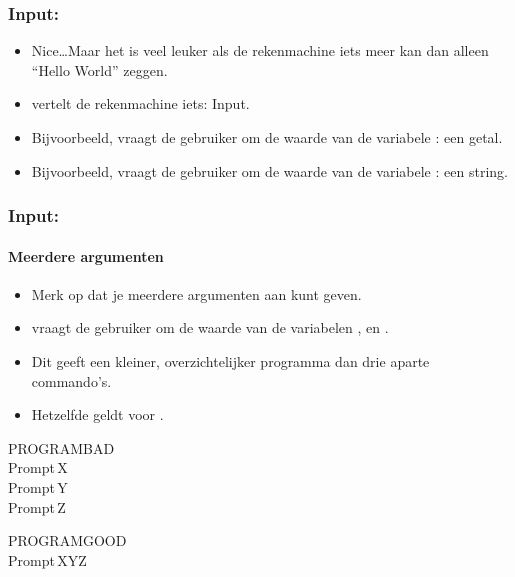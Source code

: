 \begin{frame}
\frametitle{Input: }

\begin{itemize}
  \item<1-> Nice\ldots Maar het is veel leuker als de rekenmachine iets meer kan dan alleen ``Hello World'' zeggen.
  \item<2->  vertelt de rekenmachine iets: Input.
  \item<3-> Bijvoorbeeld,  vraagt de gebruiker om de waarde van de variabele : een getal.
  \item<4-> Bijvoorbeeld,  vraagt de gebruiker om de waarde van de variabele : een string.
\end{itemize}


\end{frame}

\begin{frame}
\frametitle{Input: }
\framesubtitle{Meerdere argumenten}

\begin{itemize}
  \item<1-> Merk op dat je meerdere argumenten aan  kunt geven.
  \item<2->  vraagt de gebruiker om de waarde van de variabelen ,  en .
  \item<3-> Dit geeft een kleiner, overzichtelijker programma dan drie aparte  commando's.
  \item<4-> Hetzelfde geldt voor .
\end{itemize}

\begin{ticalc}
	PROGRAM\:BAD \\%
	\:Prompt\,X \\%
	\:Prompt\,Y \\%
	\:Prompt\,Z
\end{ticalc}
\begin{ticalc}
	PROGRAM\:GOOD \\%
	\:Prompt\,X\comma Y\comma Z
\end{ticalc}

\end{frame}


